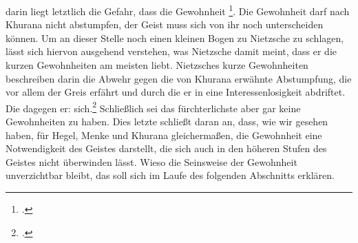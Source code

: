 \documentclass[12pt, a4paper, openany]{report}
\begin{document}
darin liegt letztlich die Gefahr, dass die Gewohnheit \footcite[][§410 (Anmerkung), S. 189]{khurana_freiheit_2017}.
Die Gewohnheit darf nach Khurana nicht abstumpfen, der Geist muss sich von ihr noch unterscheiden können. 
Um an dieser Stelle noch einen kleinen Bogen zu Nietzsche zu schlagen, lässt sich hiervon ausgehend verstehen, was Nietzsche damit meint, dass er die kurzen Gewohnheiten am meisten liebt.
Nietzsches kurze Gewohnheiten beschreiben darin die Abwehr gegen die von Khurana erwähnte Abstumpfung, die vor allem der Greis erfährt und durch die er in eine Interessenlosigkeit abdriftet.
Die  dagegen  er:  sich.\footcite[][§295, S. 535.]{nietzsche_morgenrote_1999}
Schließlich sei das fürchterlichste aber gar keine Gewohnheiten zu haben.
Dies letzte schließt daran an, dass, wie wir gesehen haben, für Hegel, Menke und Khurana gleichermaßen, die Gewohnheit eine Notwendigkeit des Geistes darstellt, die sich auch in den höheren Stufen des Geistes nicht überwinden lässt. 
Wieso die Seinsweise der Gewohnheit unverzichtbar bleibt, das soll sich im Laufe des folgenden Abschnitts erklären.
\end{document}
